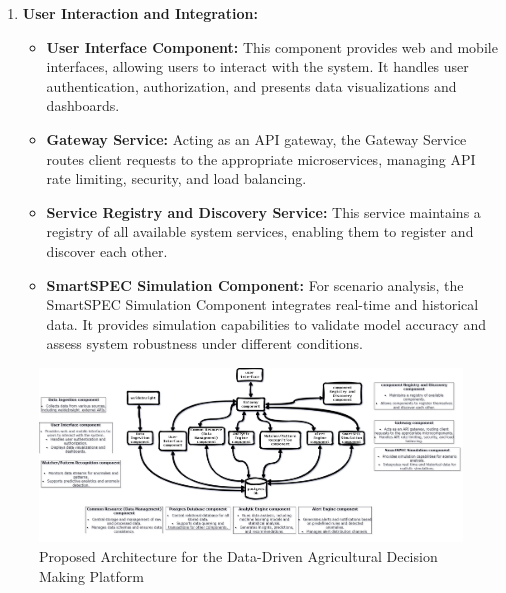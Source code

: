 \documentclass[11pt]{article}
\begin{document}
\begin{enumerate}[label=\arabic*., wide=0pt, left=0pt]
    \item \textbf{User Interaction and Integration:}
    \begin{itemize}
        \item \textbf{User Interface Component:} This component provides web and mobile interfaces, allowing users to interact with the system. It handles user authentication, authorization, and presents data visualizations and dashboards.
        \item \textbf{Gateway Service:} Acting as an API gateway, the Gateway Service routes client requests to the appropriate microservices, managing API rate limiting, security, and load balancing.
        \item \textbf{Service Registry and Discovery Service:} This service maintains a registry of all available system services, enabling them to register and discover each other.
        \item \textbf{SmartSPEC Simulation Component:} For scenario analysis, the SmartSPEC Simulation Component integrates real-time and historical data. It provides simulation capabilities to validate model accuracy and assess system robustness under different conditions.
    \end{itemize}
\end{enumerate}
\begin{figure}[h!]
    \centering
    \includegraphics[width=\textwidth]{archite.png}
    \caption{Proposed Architecture for the Data-Driven Agricultural Decision Making Platform}
    \label{fig:architecture}
\end{figure}
\end{document}
